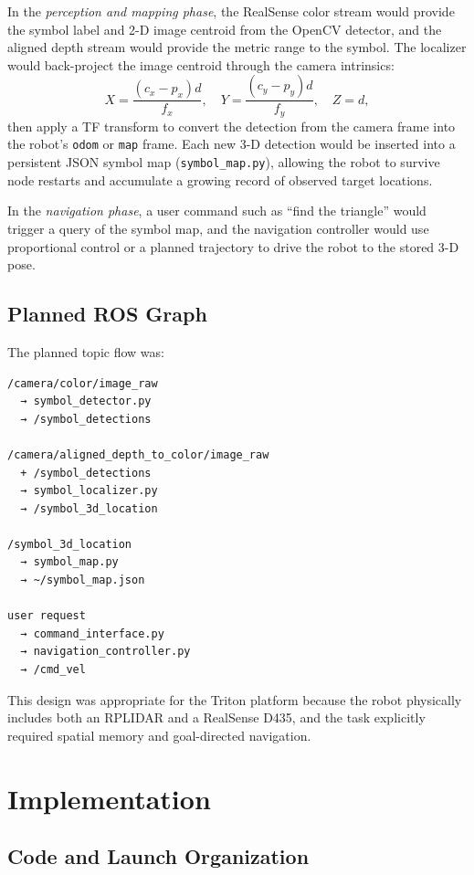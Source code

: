\documentclass[letterpaper, 10 pt, conference]{ieeeconf/ieeeconf}
\begin{document}
In the \emph{perception and mapping phase}, the RealSense color stream would
provide the symbol label and 2-D image centroid from the OpenCV detector,
and the aligned depth stream would provide the metric range to the symbol.
The localizer would back-project the image centroid through the camera
intrinsics:
\[
  X = \frac{(c_x - p_x)d}{f_x}, \quad
  Y = \frac{(c_y - p_y)d}{f_y}, \quad
  Z = d,
\]
then apply a TF transform to convert the detection from the camera frame into
the robot's \texttt{odom} or \texttt{map} frame.
Each new 3-D detection would be inserted into a persistent JSON symbol map
(\texttt{symbol\_map.py}), allowing the robot to survive node restarts and
accumulate a growing record of observed target locations.

In the \emph{navigation phase}, a user command such as ``find the triangle''
would trigger a query of the symbol map, and the navigation controller would
use proportional control or a planned trajectory to drive the robot to the
stored 3-D pose.

\subsection{Planned ROS Graph}

The planned topic flow was:
\begin{verbatim}
/camera/color/image_raw
  → symbol_detector.py
  → /symbol_detections

/camera/aligned_depth_to_color/image_raw
  + /symbol_detections
  → symbol_localizer.py
  → /symbol_3d_location

/symbol_3d_location
  → symbol_map.py
  → ~/symbol_map.json

user request
  → command_interface.py
  → navigation_controller.py
  → /cmd_vel
\end{verbatim}

This design was appropriate for the Triton platform because the robot
physically includes both an RPLIDAR and a RealSense D435, and the task
explicitly required spatial memory and goal-directed navigation.

\section{Implementation}
\label{sec:implementation}

\subsection{Code and Launch Organization}
\end{document}
